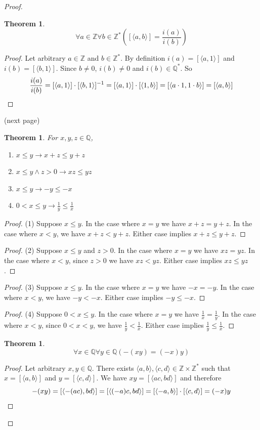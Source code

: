 \documentclass{report}
\newtheorem{theorem}[theo]{Theorem}
\begin{document}
\begin{proof}
\begin{theorem}
\begin{equation*}
\forall a\in\mathbb Z\forall b\in\mathbb Z^*\left([\langle a,b\rangle]=\frac{i(a)}{i(b)}\right)
\end{equation*}
\end{theorem}
\begin{proof}
Let arbitrary $a\in\mathbb Z$ and $b\in\mathbb Z^*$. By definition $i(a)=[\langle a,1\rangle]$ and $i(b)=[\langle b,1\rangle]$. 
Since $b\neq0$, $i(b)\neq0$ and $i(b)\in\mathbb Q^*$. So
\begin{equation*}
\frac{i(a)}{i(b)}=[\langle a,1\rangle]\cdot[\langle b,1\rangle]^{-1}=[\langle a,1\rangle]\cdot[\langle 1,b\rangle]=[\langle a\cdot1,1\cdot b\rangle]
=[\langle a,b\rangle]\qedhere
\end{equation*}
\end{proof}
\noindent(next page)\newpage
\begin{theorem}
For $x,y,z\in\mathbb Q$,
\begin{enumerate}
\item$x\leq y\to x+z\leq y+z$
\item$x\leq y\land z>0\to xz\leq yz$
\item$x\leq y\to-y\leq-x$
\item$0<x\leq y\to\frac1y\leq\frac1x$
\end{enumerate}
\end{theorem}
\begin{proof}(1)
Suppose $x\leq y$. In the case where $x=y$ we have $x+z=y+z$. In the case where $x<y$, we have $x+z<y+z$. Either case implies $x+z\leq y+z$.
\end{proof}
\begin{proof}(2)
Suppose $x\leq y$ and $z>0$. In the case where $x=y$ we have $xz=yz$. In the case where $x<y$, since $z>0$ we have $xz<yz$. 
Either case implies $xz\leq yz$.
\end{proof}
\begin{proof}(3)
Suppose $x\leq y$. In the case where $x=y$ we have $-x=-y$. In the case where $x<y$, we have $-y<-x$. Either case implies $-y\leq-x$.
\end{proof}
\begin{proof}(4)
Suppose $0<x\leq y$. In the case where $x=y$ we have $\frac1x=\frac1y$. In the case where $x<y$, since $0<x<y$, we have $\frac1y<\frac1x$.
Either case implies $\frac1y\leq\frac1x$.
\end{proof}
\begin{theorem}
\begin{equation*}
\forall x\in\mathbb Q\forall y\in\mathbb Q(-(xy)=(-x)y)
\end{equation*}
\end{theorem}
\begin{proof}
Let arbitrary $x,y\in\mathbb Q$. There exists $\langle a,b\rangle,\langle c,d\rangle\in\mathbb Z\times\mathbb Z^*$ such that 
$x=[\langle a,b\rangle]$ and $y=[\langle c,d\rangle]$.
We have $xy=[\langle ac,bd\rangle]$ and therefore
\begin{equation*}
-(xy)=[\langle-(ac),bd\rangle]=[\langle(-a)c,bd\rangle]=
[\langle-a,b\rangle]\cdot[\langle c,d\rangle]=(-x)y\qedhere
\end{equation*}
\end{proof}
\end{proof}
\end{document}
